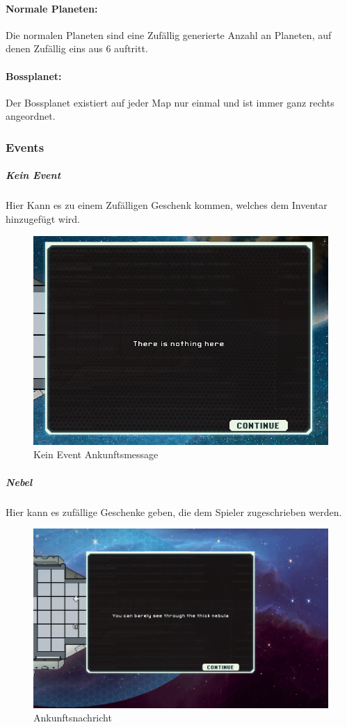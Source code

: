 \documentclass[fontsize=12pt,paper=a4,twoside]{scrartcl}
\begin{document}
\paragraph{Normale Planeten: }
Die normalen Planeten sind eine Zufällig generierte Anzahl an Planeten, auf denen Zufällig eins aus 6  auftritt.

\paragraph{Bossplanet: }
Der Bossplanet existiert auf jeder Map nur einmal und ist immer ganz rechts angeordnet. 


\subsubsection{Events}
\label{sec:Events}

\subparagraph{Kein Event} Hier Kann es zu einem Zufälligen Geschenk kommen, welches dem Inventar hinzugefügt wird.

\begin{figure}[H]
\centering
\includegraphics[width=1\linewidth]{DasSpiel/Karte/nothing.png}
\caption{Kein Event Ankunftsmessage}
\end{figure}
 
\subparagraph{Nebel} Hier kann es zufällige Geschenke geben, die dem Spieler zugeschrieben werden.

\begin{figure}[H]
\centering
\includegraphics[width=0.8\linewidth]{DasSpiel/Karte/nebular.png}
\caption{Ankunftsnachricht}
\end{figure} 
\end{document}
